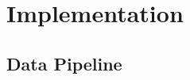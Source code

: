\documentclass[logo,msc]{infthesis}
\begin{document}
\chapter{Implementation}

\section{Data Pipeline}
%
%
%
%
%
\end{document}

